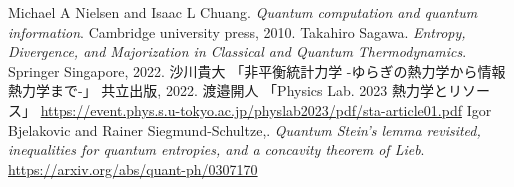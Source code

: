 \begin{thebibliography}{99}
  Michael A Nielsen and Isaac L Chuang. 
      \textit{Quantum computation and quantum information}.
      Cambridge university press, 2010.
  Takahiro Sagawa. 
      \textit{Entropy, Divergence, and Majorization in Classical and Quantum Thermodynamics}. 
      Springer Singapore, 2022.
  沙川貴大
      「非平衡統計力学 -ゆらぎの熱力学から情報熱力学まで-」
      共立出版, 2022. 
  渡邉開人
      「Physics Lab. 2023 熱力学とリソース」
      \url{https://event.phys.s.u-tokyo.ac.jp/physlab2023/pdf/sta-article01.pdf}
  Igor Bjelakovic and Rainer Siegmund-Schultze,. 
      \textit{Quantum Stein's lemma revisited, inequalities for quantum entropies, and a concavity theorem of Lieb}. 
      \url{https://arxiv.org/abs/quant-ph/0307170}
  \end{thebibliography}